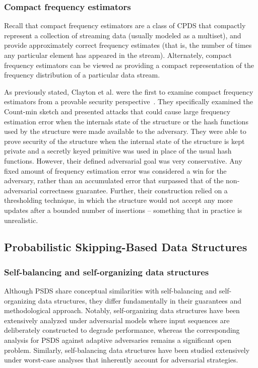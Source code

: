 \subsubsection{Compact frequency estimators}

Recall that compact frequency estimators are a class of CPDS that compactly represent a collection of streaming data (usually modeled as a multiset), and provide approximately correct frequency estimates (that is, the number of times any particular element has appeared in the stream). Alternately, compact frequency estimators can be viewed as providing a compact representation of the frequency distribution of a particular data stream. 

As previously stated, Clayton et al. were the first to examine compact frequency estimators from a provable security perspective~\cite{clayton2019}. They specifically examined the Count-min sketch and presented attacks that could cause large frequency estimation error when the internals state of the structure or the hash functions used by the structure were made available to the adversary. They were able to prove security of the structure when the internal state of the structure is kept private and a secretly keyed primitive was used in place of the usual hash functions. However, their defined adversarial goal was very conservative. Any fixed amount of frequency estimation error was considered a win for the adversary, rather than an accumulated error that surpassed that of the non-adversarial correctness guarantee. Further, their construction relied on a thresholding technique, in which the structure would not accept any more updates after a bounded number of insertions -- something that in practice is unrealistic.  

\subsection{Probabilistic Skipping-Based Data Structures}

\subsubsection{Self-balancing and self-organizing data structures}

Although PSDS share conceptual similarities with self-balancing and self-organizing data structures, they differ fundamentally in their guarantees and methodological approach. 
Notably, self-organizing data structures have been extensively analyzed under adversarial models where input sequences are deliberately constructed to degrade performance, whereas the corresponding analysis for PSDS against adaptive adversaries remains a significant open problem. Similarly, self-balancing data structures have been studied extensively under worst-case analyses that inherently account for adversarial strategies.

